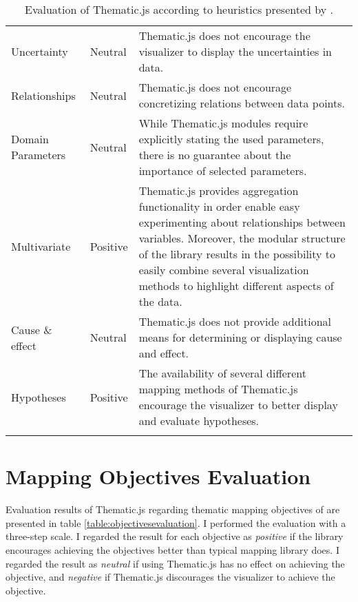 \begin{longtable}{|p{3cm}|p{2.2cm}|p{7.8cm}|}
Uncertainty & Neutral & Thematic.js does not encourage the visualizer to display the uncertainties in data. \\[0.5em] %
Relationships & Neutral & Thematic.js does not encourage concretizing relations between data points. \\[0.5em] %
Domain Parameters & Neutral & While Thematic.js modules require explicitly stating the used parameters, there is no guarantee about the importance of selected parameters. \\[0.5em] %
Multivariate & Positive & Thematic.js provides aggregation functionality in order enable easy experimenting about relationships between variables. Moreover, the modular structure of the library results in the possibility to easily combine several visualization methods to highlight different aspects of the data. \\[0.5em] %
Cause \& effect & Neutral & Thematic.js does not provide additional means for determining or displaying cause and effect. \\[0.5em] %
Hypotheses & Positive & The availability of several different mapping methods of Thematic.js encourage the visualizer to better display and evaluate hypotheses. \\[0.5em] %
\hline
\caption{Evaluation of Thematic.js according to heuristics presented by \citet{zuk_heuristics_2006}.}
\label{table:heuristicsevaluation}
\end{longtable}

\chapter{Mapping Objectives Evaluation}
\label{appendix:objectivesevaluation}

Evaluation results of Thematic.js regarding thematic mapping objectives of \citet{schlichtmann_visualization_2002} are presented in table \ref{table:objectivesevaluation}. I performed the evaluation with a three-step scale. I regarded the result for each objective as \emph{positive} if the library encourages achieving the objectives better than typical mapping library does. I regarded the result as \emph{neutral} if using Thematic.js has no effect on achieving the objective, and \emph{negative} if Thematic.js discourages the visualizer to achieve the objective.

